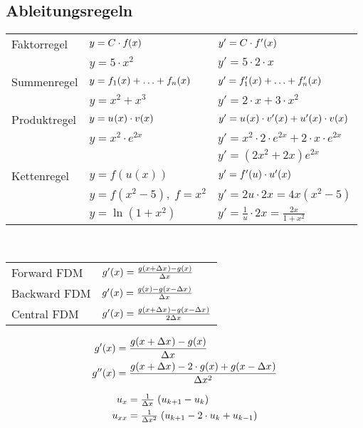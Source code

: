 \documentclass[
	final,
	a4paper,
	oneside,
	parskip=full,
	headings=standardclasses,
	headings=big,
	pointednumbers,
    fleqn
]{scrartcl}
\newcommand{\fs}[2]{{\tfrac{#1}{#2}}}
\newcommand{\kl}[1]{{\left( #1 \right)}}
\begin{document}
    \subsection*{Ableitungsregeln}
    
    \renewcommand{\arraystretch}{1.25}
    \begin{tabular}{lll}
        Faktorregel  & $ y = C \cdot \fx$                   & $ y' = C \cdot \dfx $ \\
                     & $ y = 5 \cdot x^2 $                  & $ y' = 5 \cdot 2 \cdot x$ \\
        Summenregel  & $ y = \fx[1] + \ldots +  \fx[n] $    & $ y' = \dfx[1] + \ldots + \dfx[n] $\\
                     & $ y = x^2 + x^3$                     & $ y' = 2 \cdot x + 3 \cdot x^2$ \\
        Produktregel & $ y = \fx[][u] \cdot \fx[][v] $      & $ y' = \fx[][u] \cdot \dfx[][v] + \dfx[][u] \cdot \fx[][v] $ \\
                     & $ y = x^2 \cdot e^{2x}  $            & $ y' = x^2 \cdot 2\cdot e^{2x} + 2\cdot x \cdot e^{2x} $ \\
                     &                                      & $ y' = {\left( 2x^2 + 2x \right)} e^{2x} $ \\
        Kettenregel  & $ y = f\kl{u\kl{x}} $                & $ y' = \dfx[][f][u] \cdot \dfx[][u][x] $ \\
                     & $ y = f\kl{x^2 - 5}, \; f = x^2 $    & $ y' = 2 u \cdot 2x = 4x \kl{x^2 - 5} $ \\
                     & $ y = \ln\kl{1 + x^2} $              & $ y' = \frac{1}{u} \cdot 2x = \frac{2x}{1 + x^2} $ \\
    \end{tabular} \\

    {\renewcommand{\arraystretch}{1.75}
    \begin{tabular}{ll}
        Forward FDM  & $g'\kl{x} = \frac{g \kl{x + \dx} - g \kl{x}}{\dx}$ \\
        Backward FDM & $g'\kl{x} = \frac{g \kl{x} - g \kl{x - \dx}}{\dx}$ \\
        Central FDM  & $g'\kl{x} = \frac{g \kl{x + \dx} - g \kl{x - \dx}}{2\dx}$
    \end{tabular}}

	\begin{minipage}{0.3\textwidth}
        \begin{align*}
            g'\kl{x}  &= \frac{g \kl{x + \dx} - g \kl{x}}{\dx} \\
            g''\kl{x} &= \frac{g \kl{x + \dx} - 2 \cdot g\kl{x} + g \kl{x - \dx}}{\dx[2]}
        \end{align*}
    \end{minipage}
	\begin{minipage}{0.7\textwidth}
        \begin{align*}
            u_{x}  &= \fs{1}{\dx}    \; \kl{u_{k+1} - u_{k}} \\
            u_{xx} &= \fs{1}{\dx[2]} \; \kl{u_{k+1} - 2\cdot u_{k} + u_{k-1}}
        \end{align*}
    \end{minipage}
    
\end{document}
